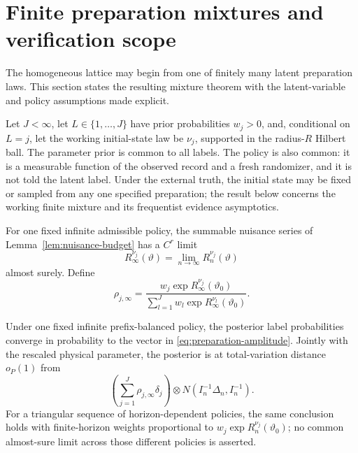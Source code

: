 
\section{Finite preparation mixtures and verification scope}
\label{sec:preparations}

The homogeneous lattice may begin from one of finitely many latent
preparation laws.  This section states the resulting mixture theorem with the
latent-variable and policy assumptions made explicit.

Let \(J<\infty\), let \(L\in\{1,\ldots,J\}\) have prior probabilities
\(w_j>0\), and, conditional on \(L=j\), let the working initial-state law be
\(\nu_j\), supported in the radius-\(R\) Hilbert ball.  The parameter prior is
common to all labels.  The policy is also common: it is a measurable function
of the observed record and a fresh randomizer, and it is not told the latent
label.  Under the external truth, the initial state may be fixed or sampled
from any one specified preparation; the result below concerns the working
finite mixture and its frequentist evidence asymptotics.

For one fixed infinite admissible policy, the summable nuisance series of
Lemma~\ref{lem:nuisance-budget} has a \(C^r\) limit
\[
 R_\infty^{\nu_j}(\vartheta)
 =\lim_{n\to\infty}R_n^{\nu_j}(\vartheta)
\]
almost surely.  Define
\begin{equation}
 \rho_{j,\infty}
 =\frac{w_j\exp R_\infty^{\nu_j}(\vartheta_0)}
        {\sum_{l=1}^Jw_l\exp R_\infty^{\nu_l}(\vartheta_0)}.
 \label{eq:preparation-amplitude}
\end{equation}

\begin{theorem}
\label{thm:preparation-mixture}
Under one fixed infinite prefix-balanced policy, the posterior label probabilities
converge in probability to the vector in
\eqref{eq:preparation-amplitude}.  Jointly with the rescaled physical
parameter, the posterior is at total-variation distance \(o_P(1)\) from
\begin{equation}
 \left(\sum_{j=1}^J\rho_{j,\infty}\delta_j\right)
 \otimes N(I_n^{-1}\Delta_n,I_n^{-1}).
 \label{eq:preparation-product}
\end{equation}
For a triangular sequence of horizon-dependent policies, the same conclusion
holds with finite-horizon weights proportional to
\(w_j\exp R_n^{\nu_j}(\vartheta_0)\); no common almost-sure limit across those
different policies is asserted.
\end{theorem}

